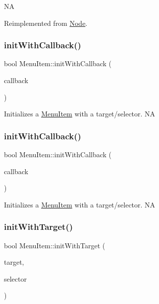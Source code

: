 NA 

Reimplemented from \hyperlink{classNode_a41710375a0d92a4ee54c39fe123b5912}{Node}.

\mbox{\label{classMenuItem_a15599490c1ba216f1a87394b798859dd}} 
\subsubsection{\texorpdfstring{init\+With\+Callback()}{initWithCallback()}\hspace{0.1cm}{\footnotesize\ttfamily [1/2]}}
{\footnotesize\ttfamily bool Menu\+Item\+::init\+With\+Callback (\begin{DoxyParamCaption}\item[{const cc\+Menu\+Callback \&}]{callback }\end{DoxyParamCaption})}

Initializes a \hyperlink{classMenuItem}{Menu\+Item} with a target/selector.  NA \mbox{\label{classMenuItem_a15599490c1ba216f1a87394b798859dd}} 
\subsubsection{\texorpdfstring{init\+With\+Callback()}{initWithCallback()}\hspace{0.1cm}{\footnotesize\ttfamily [2/2]}}
{\footnotesize\ttfamily bool Menu\+Item\+::init\+With\+Callback (\begin{DoxyParamCaption}\item[{const cc\+Menu\+Callback \&}]{callback }\end{DoxyParamCaption})}

Initializes a \hyperlink{classMenuItem}{Menu\+Item} with a target/selector.  NA \mbox{\label{classMenuItem_af427b11bfc6e76d5d2c93c94dafd7aa6}} 
\subsubsection{\texorpdfstring{init\+With\+Target()}{initWithTarget()}\hspace{0.1cm}{\footnotesize\ttfamily [1/2]}}
{\footnotesize\ttfamily bool Menu\+Item\+::init\+With\+Target (\begin{DoxyParamCaption}\item[{cocos2d\+::\+Ref $\ast$}]{target,  }\item[{S\+E\+L\+\_\+\+Menu\+Handler}]{selector }\end{DoxyParamCaption})}

